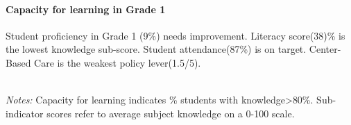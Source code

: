 \documentclass[twocolumn]{article}
\let\oldparagraph\paragraph
\renewcommand{\paragraph}[1]{\oldparagraph{#1}\mbox{}}
\begin{document}
\hypertarget{capacity-for-learning-in-grade-1}{%
\paragraph{\texorpdfstring{\textbf{Capacity for learning in Grade
1}}{Capacity for learning in Grade 1}}\label{capacity-for-learning-in-grade-1}}

Student proficiency in Grade 1 (9\%) needs improvement. Literacy
score(38)\% is the lowest knowledge sub-score. Student attendance(87\%)
is on target. Center-Based Care is the weakest policy lever(1.5/5).

\begin{table}[H]
\\
\color{darkgray}\scriptsize{\textit{Notes:} Capacity for learning indicates \% students with knowledge\textgreater{80\%}. Sub-indicator scores refer to average subject knowledge on a 0-100 scale.}
\end{table}
\vfill\null
\end{document}
